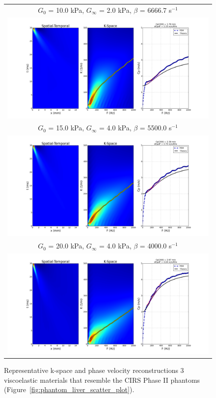 \begin{figure}[htb!]
    \centering
    \begin{tabular}{c}
        $G_0$ = 10.0 kPa, $G_\infty$ = 2.0 kPa, $\beta$ = 6666.7 s$^{-1}$\\
        \includegraphics[width=0.75\linewidth]{figs/G010kPa_GI2kPa_BETA6667.png}\\
        $G_0$ = 15.0 kPa, $G_\infty$ = 4.0 kPa, $\beta$ = 5500.0 s$^{-1}$\\
        \includegraphics[width=0.75\linewidth]{figs/G015kPa_GI4kPa_BETA5500.png}\\
        $G_0$ = 20.0 kPa, $G_\infty$ = 4.0 kPa, $\beta$ = 4000.0 s$^{-1}$\\
        \includegraphics[width=0.75\linewidth]{figs/G020kPa_GI4kPa_BETA4000.png}\\
    \end{tabular}
    \caption{Representative k-space and phase velocity reconstructions 3
        viscoelastic materials that resemble the CIRS Phase II phantoms
        (Figure~\ref{fig:phantom_liver_scatter_plot}).}
\label{fig:ve_data}
\end{figure}

